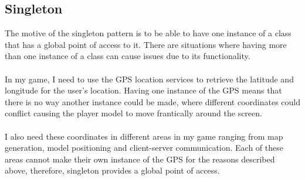 \documentclass[a4paper]{report}
\begin{document}
\subsection{Singleton}
The motive of the singleton pattern is to be able to have one instance of a class that has a global point of access to it. There are situations where having more than one instance of a class can cause issues due to its functionality. 
\\\\
In my game, I need to use the GPS location services to retrieve the latitude and longitude for the user's location. Having one instance of the GPS means that there is no way another instance could be made, where different coordinates could conflict causing the player model to move frantically around the screen. \cite{GOF}
\\\\
I also need these coordinates in different areas in my game ranging from map generation, model positioning and client-server communication. Each of these areas cannot make their own instance of the GPS for the reasons described above, therefore, singleton provides a global point of access. \cite{GPP}
\end{document}
